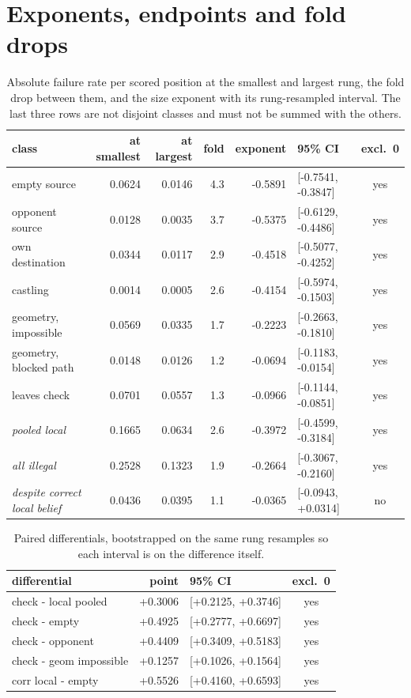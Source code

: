 \documentclass[11pt]{article}
\begin{document}
\section{Exponents, endpoints and fold drops}

\begin{table}[htbp]
\centering\small
\caption{Absolute failure rate per scored position at the smallest and largest rung, the fold drop between them, and the size exponent with its rung-resampled interval. The last three rows are not disjoint classes and must not be summed with the others.}
\label{tab:s-exponents}
\begin{tabular}{lrrrrlc}
\toprule
class & at smallest & at largest & fold & exponent & 95\% CI & excl.\ 0 \\
\midrule
empty source & 0.0624 & 0.0146 & 4.3 & -0.5891 & [-0.7541, -0.3847] & yes \\
opponent source & 0.0128 & 0.0035 & 3.7 & -0.5375 & [-0.6129, -0.4486] & yes \\
own destination & 0.0344 & 0.0117 & 2.9 & -0.4518 & [-0.5077, -0.4252] & yes \\
castling & 0.0014 & 0.0005 & 2.6 & -0.4154 & [-0.5974, -0.1503] & yes \\
geometry, impossible & 0.0569 & 0.0335 & 1.7 & -0.2223 & [-0.2663, -0.1810] & yes \\
geometry, blocked path & 0.0148 & 0.0126 & 1.2 & -0.0694 & [-0.1183, -0.0154] & yes \\
leaves check & 0.0701 & 0.0557 & 1.3 & -0.0966 & [-0.1144, -0.0851] & yes \\
\textit{pooled local} & 0.1665 & 0.0634 & 2.6 & -0.3972 & [-0.4599, -0.3184] & yes \\
\textit{all illegal} & 0.2528 & 0.1323 & 1.9 & -0.2664 & [-0.3067, -0.2160] & yes \\
\textit{despite correct local belief} & 0.0436 & 0.0395 & 1.1 & -0.0365 & [-0.0943, +0.0314] & no \\
\bottomrule
\end{tabular}
\end{table}

\begin{table}[htbp]
\centering\small
\caption{Paired differentials, bootstrapped on the same rung resamples so each interval is on the difference itself.}
\label{tab:s-diffs}
\begin{tabular}{lrlc}
\toprule
differential & point & 95\% CI & excl.\ 0 \\
\midrule
check - local pooled & +0.3006 & [+0.2125, +0.3746] & yes \\
check - empty & +0.4925 & [+0.2777, +0.6697] & yes \\
check - opponent & +0.4409 & [+0.3409, +0.5183] & yes \\
check - geom impossible & +0.1257 & [+0.1026, +0.1564] & yes \\
corr local - empty & +0.5526 & [+0.4160, +0.6593] & yes \\
\bottomrule
\end{tabular}
\end{table}
\end{document}
